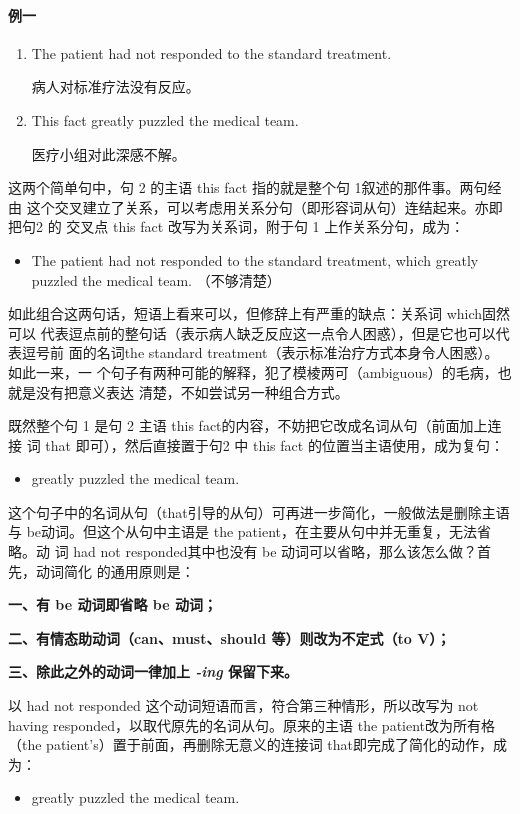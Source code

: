 \paragraph{例一}

\begin{enumerate}
\item The patient had not responded to the standard treatment.

  病人对标准疗法没有反应。
\item This fact greatly puzzled the medical team.

  医疗小组对此深感不解。
\end{enumerate}

这两个简单句中，句 2 的主语 this fact 指的就是整个句 1叙述的那件事。两句经由
这个交叉建立了关系，可以考虑用关系分句（即形容词从句）连结起来。亦即把句2 的
交叉点 this fact 改写为关系词，附于句 1 上作关系分句，成为：
\begin{itemize}
\item The patient had not responded to the standard treatment, which greatly
  puzzled the medical team. （不够清楚）
\end{itemize}

如此组合这两句话，短语上看来可以，但修辞上有严重的缺点：关系词 which固然可以
代表逗点前的整句话（表示病人缺乏反应这一点令人困惑），但是它也可以代表逗号前
面的名词the standard treatment（表示标准治疗方式本身令人困惑）。如此一来，一
个句子有两种可能的解释，犯了模棱两可（ambiguous）的毛病，也就是没有把意义表达
清楚，不如尝试另一种组合方式。

既然整个句 1 是句 2 主语 this fact的内容，不妨把它改成名词从句（前面加上连接
词 that 即可），然后直接置于句2 中 this fact 的位置当主语使用，成为复句：
\begin{itemize}
\item {} greatly
  puzzled the medical team.
\end{itemize}
这个句子中的名词从句（that引导的从句）可再进一步简化，一般做法是删除主语
与 be动词。但这个从句中主语是 the patient，在主要从句中并无重复，无法省略。动
词 had not responded其中也没有 be 动词可以省略，那么该怎么做？首先，动词简化
的通用原则是：

\textbf{一、有 be 动词即省略 be 动词；}

\textbf{二、有情态助动词（can、must、should 等）则改为不定式（to V）；}

\textbf{三、除此之外的动词一律加上 \emph{-ing} 保留下来。}

以 had not responded 这个动词短语而言，符合第三种情形，所以改写为 not having
responded，以取代原先的名词从句。原来的主语 the patient改为所有格（the
patient's）置于前面，再删除无意义的连接词 that即完成了简化的动作，成为：
\begin{itemize}
\item {}
  greatly puzzled the medical team.
\end{itemize}

